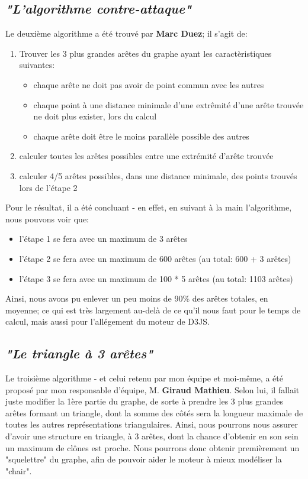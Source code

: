 \documentclass[12pt]{report}
\begin{document}
\begin{spacing}{1.2}
\subsection{\textit{"L'algorithme contre-attaque"}}
Le deuxième algorithme a été trouvé par \textbf{Marc Duez}; il s'agit de:
\begin{enumerate}
\item Trouver les 3 plus grandes arêtes du graphe ayant les caractèristiques suivantes:
	\begin{itemize}
	\item chaque arête ne doit pas avoir de point commun avec les autres
	\item chaque point à une distance minimale d'une extrêmité d'une arête trouvée ne doit plus exister, lors du calcul
	\item chaque arête doit être le moins parallèle possible des autres
	\end{itemize}
\item calculer toutes les arêtes possibles entre une extrémité d'arête trouvée
\item calculer 4/5 arêtes possibles, dans une distance minimale, des points trouvés lors de l'étape 2
\end{enumerate}
Pour le résultat, il a été concluant - en effet, en suivant à la main l'algorithme, nous pouvons voir que:
\begin{itemize}
\item l'étape 1 se fera avec un maximum de 3 arêtes
\item l'étape 2 se fera avec un maximum de 600 arêtes (au total: 600 + 3 arêtes)
\item l'étape 3 se fera avec un maximum de 100 * 5 arêtes (au total: 1103 arêtes)
\end{itemize}
Ainsi, nous avons pu enlever un peu moins de 90\% des arêtes totales, en moyenne; ce qui est très largement au-delà de ce qu'il nous faut pour le temps de calcul, mais aussi pour l'allégement du moteur de D3JS.

\subsection{\textit{"Le triangle à 3 arêtes"}}
Le troisième algorithme - et celui retenu par mon équipe et moi-même, a été proposé par mon responsable d'équipe, M. \textbf{Giraud Mathieu}.
\newline
Selon lui, il fallait juste modifier la 1ère partie du graphe, de sorte à prendre les 3 plus grandes arêtes formant un triangle, dont la somme des côtés sera la longueur maximale de toutes les autres représentations triangulaires.
\newline
Ainsi, nous pourrons nous assurer d'avoir une structure en triangle, à 3 arêtes, dont la chance d'obtenir en son sein un maximum de clônes est proche.
\newline
Nous pourrons donc obtenir premièrement un "squelettre" du graphe, afin de pouvoir aider le moteur à mieux modéliser la "chair".


\end{spacing}
\end{document}
